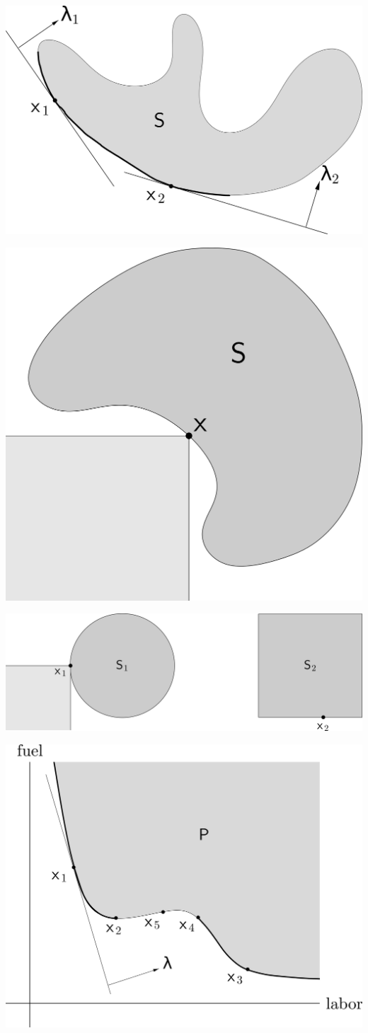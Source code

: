 \clearpage
\hfil\includegraphics[width=.5\textwidth]{../Graphics/056a.png}\hfil

\clearpage
\hfil\includegraphics[width=.5\textwidth]{../Graphics/056b.png}\hfil

\clearpage
\hfil\includegraphics[width=.5\textwidth]{../Graphics/057.png}\hfil

\clearpage
\hfil\includegraphics[width=.5\textwidth]{../Graphics/058.png}\hfil


